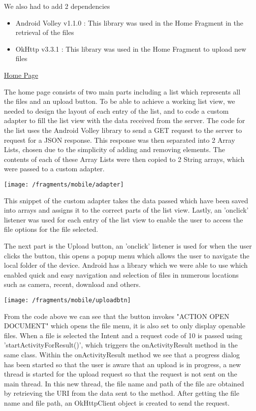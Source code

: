 \documentclass{article}
\begin{document}
We also had to add 2 dependencies 

\begin{itemize}
\item Android Volley v1.1.0 : This library was used in the Home Fragment in the retrieval of the files
\item OkHttp v3.3.1 : This library was used in the Home Fragment to upload new files
\end{itemize}


\underline{Home Page}

The home page consists of two main parts including a list which represents all the files and an upload button. To be able to achieve a working list view, we needed to design the layout of each entry of the list, and to code a custom adapter to fill the list view with the data received from the server. The code for the list uses the Android Volley library to send a GET request to the server to request for a JSON response. This response was then separated into 2 Array Lists, chosen due to the simplicity of adding and removing elements. The contents of each of these Array Lists were then copied to 2 String arrays, which were passed to a custom adapter. 

\texttt{[image: /fragments/mobile/adapter]}

This snippet of the custom adapter takes the data passed which have been saved into arrays and assigns it to the correct parts of the list view. Lastly, an 'onclick' listener was used for each entry of the list view to enable the user to access the file options for the file selected. 

The next part is the Upload button, an 'onclick' listener is used for when the user clicks the button, this opens a popup menu which allows the user to navigate the local folder of the device. Android has a library which we were able to use which enabled quick and easy navigation and selection of files in numerous locations such as camera, recent, download and others. 

\texttt{[image: /fragments/mobile/uploadbtn]}

From the code above we can see that the button invokes "ACTION OPEN DOCUMENT" which opens the file menu, it is also set to only display openable files. When a file is selected the Intent and a request code of 10 is passed using 'startActivityForResult()', which triggers the onActivityResult method in the same class. Within the onActivityResult method we see that a progress dialog has been started so that the user is aware that an upload is in progress, a new thread is started for the upload request so that the request is not sent on the main thread. In this new thread, the file name and path of the file are obtained by retrieving the URI from the data sent to the method. After getting the file name and file path, an OkHttpClient object is created to send the request. 
\end{document}
